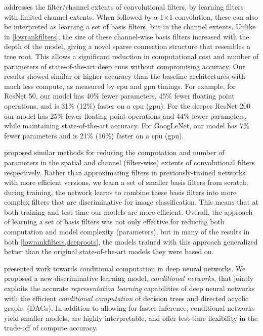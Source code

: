 \documentclass[thesis]{subfiles}
\begin{document}
 addresses the filter/channel extents of convolutional filters, by learning filters with limited channel extents. When followed by a 1$\times$1 convolution, these can also be interpreted as learning a set of basis filters, but in the channel extents. 
Unlike in \cref{lowrankfilters}, the size of these channel-wise basis filters increased with the depth of the model, giving a novel sparse connection structure that resembles a tree root. This allows a significant reduction in computational cost and number of parameters of state-of-the-art deep \glspl{cnn} without compromising accuracy. Our results showed similar or higher accuracy than the baseline architectures with much less compute, as measured by \gls{cpu} and \gls{gpu} timings. For example, for ResNet 50, our model has 40\% fewer parameters, 45\% fewer floating point operations, and is 31\% (12\%) faster on a \gls{cpu} (\gls{gpu}). For the deeper ResNet 200 our model has 25\% fewer floating point operations and 44\% fewer parameters, while maintaining state-of-the-art accuracy. For GoogLeNet, our model has 7\% fewer parameters and is 21\% (16\%) faster on a \gls{cpu} (\gls{gpu}).

 proposed similar methods for reducing the computation and number of parameters in the spatial and channel (filter-wise) extents of convolutional filters respectively. Rather than approximating filters in previously-trained networks with more efficient versions, we learn a set of smaller basis filters from scratch; during training, the network learns to combine these basis filters into more complex filters that are discriminative for image classification. This means that at both training and test time our models are more efficient. Overall, the approach of learning a set of basis filters was not only effective for reducing both computation and model complexity (parameters), but in many of the results in both \cref{lowrankfilters,deeproots}, the models trained with this approach generalized better than the original state-of-the-art models they were based on.

 presented work towards conditional computation in deep neural networks. We proposed a new discriminative learning model, \emph{conditional networks}, 
that jointly exploits the accurate \emph{representation learning} capabilities of deep neural networks with the efficient \emph{conditional computation} of decision trees and directed acyclic graphs (DAGs). In addition to allowing for faster inference, conditional networks yield smaller models, are highly interpretable, and offer test-time flexibility in the trade-off of compute \vs accuracy.
\end{document}
